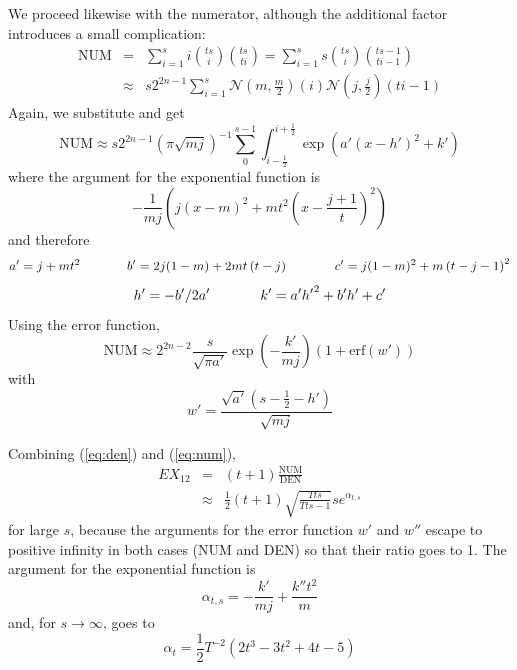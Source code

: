 \documentclass[12pt]{article}
\newcommand{\erf}[0]{\mbox{erf}}
\newcommand{\anum}[0]{a'}
\newcommand{\bnum}[0]{b'}
\newcommand{\cnum}[0]{c'}
\newcommand{\hnum}[0]{h'}
\newcommand{\knum}[0]{k'}
\newcommand{\wnum}[0]{w'}
\newcommand{\kden}[0]{k''}
\begin{document}
We proceed likewise with the numerator, although the additional factor
introduces a small complication:
  \begin{eqnarray*}
  \mbox{NUM}&=&\sum_{i=1}^{s}i\binom{ts}{i}\binom{ts}{ti}=\sum_{i=1}^{s}s\binom{ts}{i}\binom{ts-1}{ti-1}\\
&\approx&s2^{2n-1}\sum_{i=1}^{s}\mathcal{N}\left(m,\frac{m}{2}\right)(i)\mathcal{N}\left(j,\frac{j}{2}\right)(ti-1)
\end{eqnarray*}
Again, we substitute and get
\begin{displaymath}
  \mbox{NUM}\approx{}s2^{2n-1}\left(\pi\sqrt{mj}\right)^{-1}\sum_{0}^{s-1}\int_{i-\frac{1}{2}}^{i+\frac{1}{2}}\exp\left({\anum}(x-{\hnum})^{2}+{\knum}\right)
\end{displaymath}
where the argument for the exponential function is
\begin{displaymath}
  -\frac{1}{mj}\left(j(x-m)^{2}+mt^{2}\left(x-\frac{j+1}{t}\right)^{2}\right)
\end{displaymath}
and therefore
\begin{displaymath}
{\anum}=j+mt^{2}\hspace{.5in}
{\bnum}=2j(1-m)+2mt\left(t-j\right)\hspace{.5in}
{\cnum}=j(1-m)^{2}+m\left(t-j-1\right)^{2}
\end{displaymath}
\begin{displaymath}
{\hnum}=-{\bnum}/2{\anum}\hspace{.5in}
{\knum}={\anum}{\hnum}^{2}+{\bnum}{\hnum}+{\cnum}
\end{displaymath}
Using the error function, 
\begin{equation}
  \label{eq:num}
  \mbox{NUM}\approx{}2^{2n-2}\frac{s}{\sqrt{\pi{}{\anum}}}\exp\left(-\frac{{\knum}}{mj}\right)\left(1+\erf({\wnum})\right)
\end{equation}
with
\begin{displaymath}
  {\wnum}=\frac{\sqrt{{\anum}}\left(s-\frac{1}{2}-{\hnum}\right)}{\sqrt{mj}}
\end{displaymath}

Combining ({\ref{eq:den}}) and ({\ref{eq:num}}),
\begin{eqnarray*}
  EX_{12}&=&(t+1)\frac{\mbox{NUM}}{\mbox{DEN}}\\
&\approx&\frac{1}{2}(t+1)\sqrt{\frac{{T}{}ts}{{T}{}ts-1}}se^{\alpha_{t,s}}
\end{eqnarray*}
for large $s$, because the arguments for the error function $w'$ and
$w''$ escape to positive infinity in both cases (NUM and DEN) so that
their ratio goes to 1. The argument for the exponential function is
\begin{displaymath}
  \alpha_{t,s}=-\frac{{\knum}}{mj}+\frac{{\kden}t^{2}}{m}
\end{displaymath}
and, for $s\rightarrow\infty$, goes to
\begin{displaymath}
  \alpha_{t}=\frac{1}{2}{T}^{-2}(2t^{3}-3t^{2}+4t-5)
\end{displaymath}
\end{document}
